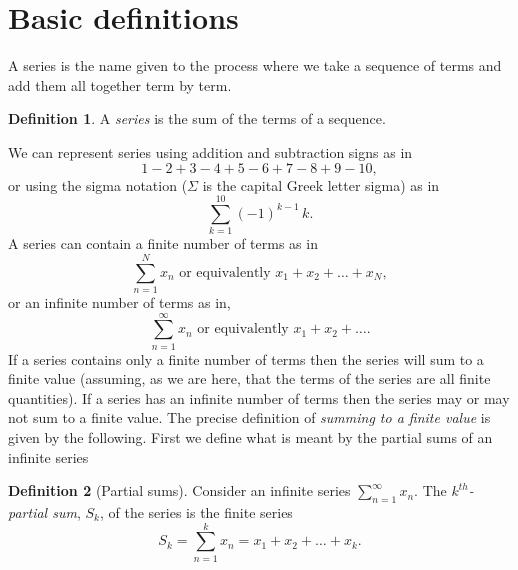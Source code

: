 \documentclass[extrafontsizes, twoside, a4paper]{memoir}
\theoremstyle{plain}%
\theoremstyle{definition}
\newtheorem{defn}{Definition}[chapter]
\theoremstyle{remark}
\begin{document}
\section{Basic definitions}
A series is the name given to the process where we take a sequence of terms and add them all together term by term.
\begin{defn}
A \emph{series} is the sum of the terms of a sequence.
\end{defn}
We can represent series using addition and subtraction signs as in
$$1 - 2 + 3 - 4 + 5 - 6 + 7 - 8 + 9 - 10 ,$$
or using the sigma notation ($\Sigma$ is the capital Greek letter sigma) as in
$$\sum_{k=1}^{10} \left ( -1 \right )^{k-1} \, k.$$
A series can contain a finite number of terms as in
$$\sum_{n=1}^N x_n \text{ or equivalently } x_1 + x_2 + \dots + x_N,$$
or an infinite number of terms as in,
$$\sum_{n=1}^\infty x_n \text{ or equivalently } x_1 + x_2 + \dots .$$
If a series contains only a finite number of terms then the series will sum to a finite value
(assuming, as we are here, that the terms of the series are all finite quantities). If a series
has an infinite number of terms then the series may or may not sum to a finite value. The
precise definition of \emph{summing to a finite value} is given by the following. First we define what is meant by the partial sums of an infinite series
\begin{defn}[Partial sums]
Consider an infinite series $\sum_{n=1}^\infty x_n$. The \emph{$k^{th}$-partial sum}, $S_k$, of the series is the finite series
$$S_k = \sum_{n=1}^k x_n = x_1 + x_2 + \dots + x_k .$$
\end{defn}
\end{document}

